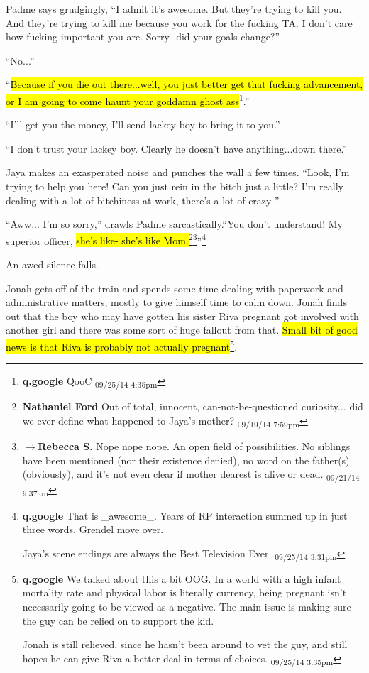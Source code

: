 Padme says grudgingly, ``I admit it's awesome.  But they're trying to kill you.  And they're trying to kill me because you work for the fucking TA.  I don't care how fucking important you are.  Sorry- did your goals change?''

``No...''

``\hl{Because if you die out there...well, you just better get that fucking advancement, or I am going to come haunt your goddamn ghost ass}\footnote{\textbf{q.google }QooC \textsubscript{09/25/14 4:35pm}}.''

``I'll get you the money, I'll send lackey boy to bring it to you.''

``I don't trust your lackey boy.  Clearly he doesn't have anything...down there.''

Jaya makes an exasperated noise and punches the wall a few times.  ``Look, I'm trying to help you here!  Can you just rein in the bitch just a little?  I'm really dealing with a lot of bitchiness at work, there's a lot of crazy-''

``Aww... I'm so sorry,'' drawls Padme sarcastically.``You don't understand!  My superior officer, \hl{she's like- she's like Mom.}\footnote{\textbf{Nathaniel Ford }Out of total, innocent, can-not-be-questioned curiosity... did we ever define what happened to Jaya's mother? \textsubscript{09/19/14 7:59pm}}\footnote{$\rightarrow$\textbf{Rebecca S. }Nope nope nope.  An open field of possibilities.  No siblings have been mentioned (nor their existence denied), no word on the father(s) (obviously), and it's not even clear if mother dearest is alive or dead. \textsubscript{09/21/14 9:37am}}''\footnote{\textbf{q.google }That is \_awesome\_.  Years of RP interaction summed up in just three words.  Grendel move over.

Jaya's scene endings are always the Best Television Ever. \textsubscript{09/25/14 3:31pm}}

An awed silence falls.  











Jonah gets off of the train and spends some time dealing with paperwork and administrative matters, mostly to give himself time to calm down.  Jonah finds out that the boy who may have gotten his sister Riva pregnant got involved with another girl and there was some sort of huge fallout from that.  \hl{Small bit of good news is that Riva is probably not actually pregnant}\footnote{\textbf{q.google }We talked about this a bit OOG.  In a world with a high infant mortality rate and physical labor is literally currency, being pregnant isn't necessarily going to be viewed as a negative.  The main issue is making sure the guy can be relied on to support the kid.

Jonah is still relieved, since he hasn't been around to vet the guy, and still hopes he can give Riva a better deal in terms of choices. \textsubscript{09/25/14 3:35pm}}.  



